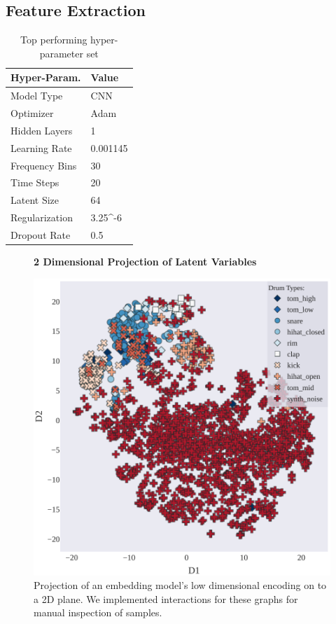 \documentclass[\main/thesis.tex]{subfiles}
\begin{document}
\subsection{Feature Extraction}
\label{fig:embedding_FE}
\begin{table}[htbp!]
\centering
\begin{tabular}{|p{6cm}|p{6cm}|}
\hline
Hyper-Param. & Value  \\ \hline
Model Type      &  CNN  \\ \hline
Optimizer       & Adam  \\ \hline
Hidden Layers   & 1  \\\hline
Learning Rate   &  0.001145\\ \hline
Frequency Bins & 30 \\ \hline
Time Steps & 20 \\ \hline
Latent Size & 64 \\ \hline
Regularization & 3.25^{-6}\\ \hline
Dropout Rate & 0.5 \\ \hline
\end{tabular}
\caption{Top performing hyper-parameter set}
\label{table:best_params}
\end{table}
\begin{figure}[h!]
\centering
\textbf{2 Dimensional Projection of Latent Variables}\par\medskip
 \includegraphics[width=0.90\linewidth]{images/chapter_3/t-SNE_2d.pdf}
\caption{Projection of an embedding model's low dimensional encoding on to a 2D plane. We implemented interactions for these graphs for manual inspection of samples.}
\label{fig:2d_tsne}
\end{figure}
\end{document}

